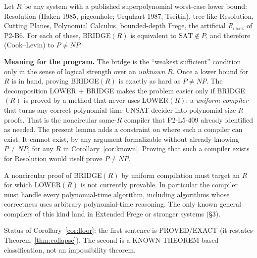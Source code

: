 \documentclass[11pt]{article}
\theoremstyle{definition}\newtheorem{definition}[theorem]{Definition}
\begin{document}
\begin{corollary}\label{cor:known}
Let $R$ be any system with a published superpolynomial worst-case lower bound: Resolution (Haken 1985, pigeonhole; Urquhart 1987, Tseitin), tree-like Resolution, Cutting Planes, Polynomial Calculus, bounded-depth Frege, the artificial $R_{\mathrm{clock}}$ of P2-B6. For each of these, BRIDGE$(R)$ is equivalent to $\mathrm{SAT}\notin P$, and therefore (Cook--Levin) to $P\neq NP$.
\end{corollary}

\noindent\textbf{Meaning for the program.} The bridge is the ``weakest sufficient'' condition only in the sense of logical strength over an \emph{unknown} $R$. Once a lower bound for $R$ is in hand, proving BRIDGE$(R)$ is exactly as hard as $P\ne NP$. The decomposition LOWER + BRIDGE makes the problem easier only if BRIDGE$(R)$ is proved by a method that never uses LOWER$(R)$: a \emph{uniform compiler} that turns any correct polynomial-time UNSAT decider into polynomial-size $R$-proofs. That is the noncircular same-$R$ compiler that P2-L5-409 already identified as needed. The present lemma adds a constraint on where such a compiler can exist. It cannot exist, by any argument formalizable without already knowing $P\ne NP$, for any $R$ in Corollary~\ref{cor:known}. Proving that such a compiler exists for Resolution would itself prove $P\neq NP$.

\begin{corollary}\label{cor:floor}
A noncircular proof of BRIDGE$(R)$ by uniform compilation must target an $R$ for which LOWER$(R)$ is not currently provable. In particular the compiler must handle every polynomial-time algorithm, including algorithms whose correctness uses arbitrary polynomial-time reasoning. The only known general compilers of this kind land in Extended Frege or stronger systems (\S3).
\end{corollary}
\noindent Status of Corollary~\ref{cor:floor}: the first sentence is PROVED/EXACT (it restates Theorem~\ref{thm:collapse}). The second is a KNOWN-THEOREM-based classification, not an impossibility theorem.
\end{document}
